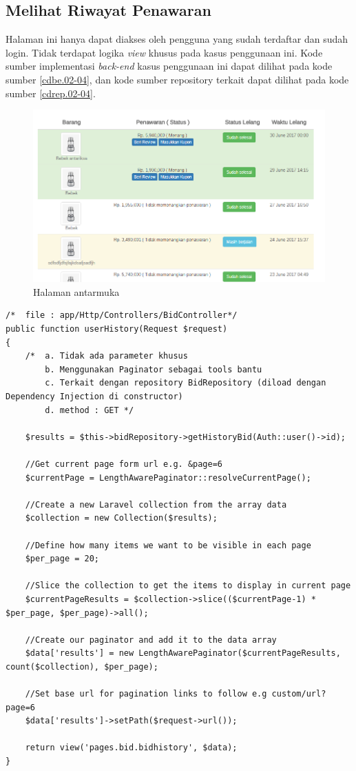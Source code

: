 \subsection{Melihat Riwayat Penawaran}
Halaman ini hanya dapat diakses oleh pengguna yang sudah terdaftar dan sudah login. Tidak terdapat logika \textit{view} khusus pada kasus penggunaan ini. Kode sumber implementasi \textit{back-end} kasus penggunaan ini dapat dilihat pada kode sumber \ref{cdbe.02-04}, dan kode sumber repository terkait dapat dilihat pada kode sumber \ref{cdrep.02-04}.

\begin{figure}[H]
    \centering
    \includegraphics[width=\textwidth]{images/bab4/ui/02-04.png}
    \caption{Halaman antarmuka }
    \label{ui.02-04}
\end{figure}

\begin{lstlisting}[label=cdbe.02-04,style=php,caption=Kode Sumber \textit{Back-end} Kasus Penggunaan: Melihat Riwayat Penawaran]
/*	file : app/Http/Controllers/BidController*/
public function userHistory(Request $request)
{
    /*  a. Tidak ada parameter khusus
        b. Menggunakan Paginator sebagai tools bantu
        c. Terkait dengan repository BidRepository (diload dengan Dependency Injection di constructor)
        d. method : GET */

    $results = $this->bidRepository->getHistoryBid(Auth::user()->id);
    
    //Get current page form url e.g. &page=6
    $currentPage = LengthAwarePaginator::resolveCurrentPage();

    //Create a new Laravel collection from the array data
    $collection = new Collection($results);

    //Define how many items we want to be visible in each page
    $per_page = 20;

    //Slice the collection to get the items to display in current page
    $currentPageResults = $collection->slice(($currentPage-1) * $per_page, $per_page)->all();

    //Create our paginator and add it to the data array
    $data['results'] = new LengthAwarePaginator($currentPageResults, count($collection), $per_page);

    //Set base url for pagination links to follow e.g custom/url?page=6
    $data['results']->setPath($request->url());

    return view('pages.bid.bidhistory', $data);
}
\end{lstlisting}

